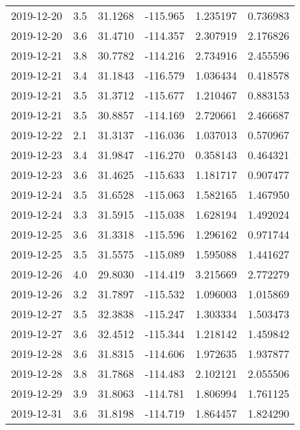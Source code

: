 \begin{tabular}{lrrrrr}
2019-12-20 &       3.5 &  31.1268 &  -115.965 &         1.235197 &         0.736983 \\
2019-12-20 &       3.6 &  31.4710 &  -114.357 &         2.307919 &         2.176826 \\
2019-12-21 &       3.8 &  30.7782 &  -114.216 &         2.734916 &         2.455596 \\
2019-12-21 &       3.4 &  31.1843 &  -116.579 &         1.036434 &         0.418578 \\
2019-12-21 &       3.5 &  31.3712 &  -115.677 &         1.210467 &         0.883153 \\
2019-12-21 &       3.5 &  30.8857 &  -114.169 &         2.720661 &         2.466687 \\
2019-12-22 &       2.1 &  31.3137 &  -116.036 &         1.037013 &         0.570967 \\
2019-12-23 &       3.4 &  31.9847 &  -116.270 &         0.358143 &         0.464321 \\
2019-12-23 &       3.6 &  31.4625 &  -115.633 &         1.181717 &         0.907477 \\
2019-12-24 &       3.5 &  31.6528 &  -115.063 &         1.582165 &         1.467950 \\
2019-12-24 &       3.3 &  31.5915 &  -115.038 &         1.628194 &         1.492024 \\
2019-12-25 &       3.6 &  31.3318 &  -115.596 &         1.296162 &         0.971744 \\
2019-12-25 &       3.5 &  31.5575 &  -115.089 &         1.595088 &         1.441627 \\
2019-12-26 &       4.0 &  29.8030 &  -114.419 &         3.215669 &         2.772279 \\
2019-12-26 &       3.2 &  31.7897 &  -115.532 &         1.096003 &         1.015869 \\
2019-12-27 &       3.5 &  32.3838 &  -115.247 &         1.303334 &         1.503473 \\
2019-12-27 &       3.6 &  32.4512 &  -115.344 &         1.218142 &         1.459842 \\
2019-12-28 &       3.6 &  31.8315 &  -114.606 &         1.972635 &         1.937877 \\
2019-12-28 &       3.8 &  31.7868 &  -114.483 &         2.102121 &         2.055506 \\
2019-12-29 &       3.9 &  31.8063 &  -114.781 &         1.806994 &         1.761125 \\
2019-12-31 &       3.6 &  31.8198 &  -114.719 &         1.864457 &         1.824290 \\

\end{tabular}
